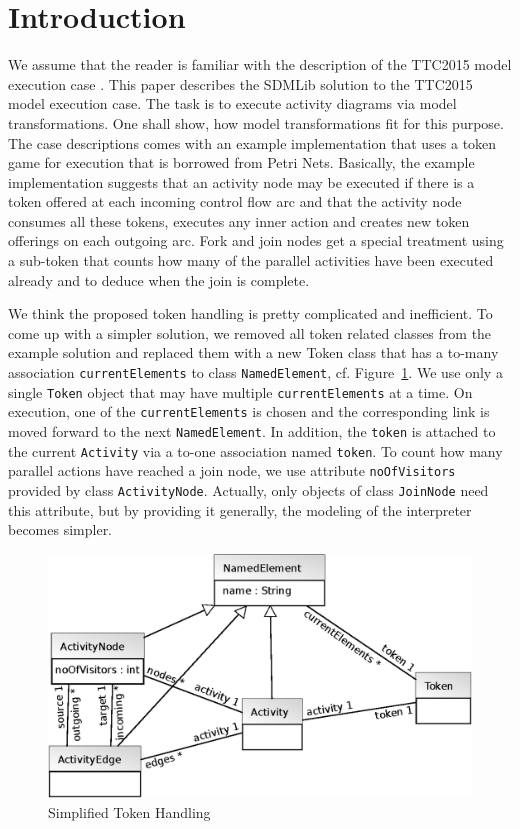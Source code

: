 \documentclass[submission,copyright,creativecommons]{eptcs}
\begin{document}
\section{Introduction}
\label{sec:intro}

We assume that the reader is familiar with the description of the TTC2015 model execution 
case \cite{ttc2015-model_execution}. This paper describes the SDMLib \cite{sdmlib} solution to the TTC2015 model 
execution case. The task is 
to execute activity diagrams via model transformations. One shall show, how model 
transformations fit for this purpose. The case descriptions comes with an example 
implementation that uses a token game for execution that is borrowed from Petri Nets. 
Basically, the example implementation suggests that an activity node may be executed if 
there is a token offered at each incoming control flow arc and that the activity node consumes 
all these tokens, executes any inner action and creates new token offerings on each outgoing arc. Fork and join nodes get a special treatment using a sub-token that counts how many of the 
parallel activities have been executed already and to deduce when the join is complete.  

We think the proposed token handling is pretty complicated and inefficient. To come up with a simpler solution, we removed all token related classes from the example solution and replaced them with a new Token class that has a to-many association \texttt{currentElements} to class \texttt{NamedElement}, cf. Figure~\ref{fig:ClassDiag}. We use only a single \texttt{Token} object that may have multiple \texttt{currentElements} at a time. On execution, one of the \texttt{currentElements} is chosen and the corresponding link is moved forward to the next \texttt{NamedElement}. In addition, the \texttt{token} is attached to the current \texttt{Activity} via a to-one association named \texttt{token}. To count how many parallel actions have reached a join node, we use attribute \texttt{noOfVisitors} provided by class \texttt{ActivityNode}. Actually, only objects of class \texttt{JoinNode} need this attribute, but by providing it generally, the modeling of the interpreter becomes simpler. 


\begin{figure}[ht] \centering
	\includegraphics[width=0.8\linewidth]{images/ClassDiag.eps}
 \caption{Simplified Token Handling}
 \label{fig:ClassDiag}
\end{figure}
\end{document}
